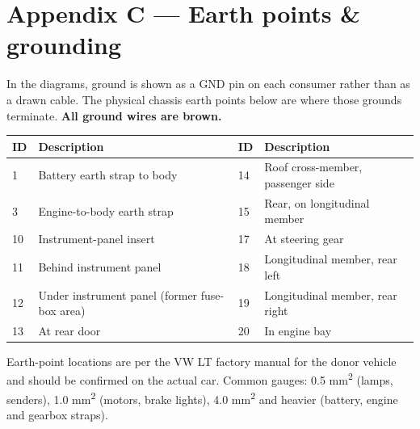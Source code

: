 \documentclass[11pt]{article}
\begin{document}
\section{Appendix C — Earth points \& grounding}
{\small In the diagrams, ground is shown as a GND pin on each consumer rather than as a drawn cable. The physical chassis earth points below are where those grounds terminate. \textbf{All ground wires are brown.}}\\[6pt]
\begin{center}\small
\begin{tabular}{|l|p{70mm}|l|p{70mm}|}
\hline
\textbf{ID} & \textbf{Description} & \textbf{ID} & \textbf{Description} \\ \hline
1 & Battery earth strap to body & 14 & Roof cross-member, passenger side \\ \hline
3 & Engine-to-body earth strap & 15 & Rear, on longitudinal member \\ \hline
10 & Instrument-panel insert & 17 & At steering gear \\ \hline
11 & Behind instrument panel & 18 & Longitudinal member, rear left \\ \hline
12 & Under instrument panel (former fuse-box area) & 19 & Longitudinal member, rear right \\ \hline
13 & At rear door & 20 & In engine bay \\ \hline
\end{tabular}
\end{center}
\vspace{4pt}\par{\footnotesize\color{gray} Earth-point locations are per the VW LT factory manual for the donor vehicle and should be confirmed on the actual car. Common gauges: 0.5 mm\textsuperscript{2} (lamps, senders), 1.0 mm\textsuperscript{2} (motors, brake lights), 4.0 mm\textsuperscript{2} and heavier (battery, engine and gearbox straps).}
\clearpage
\end{document}
